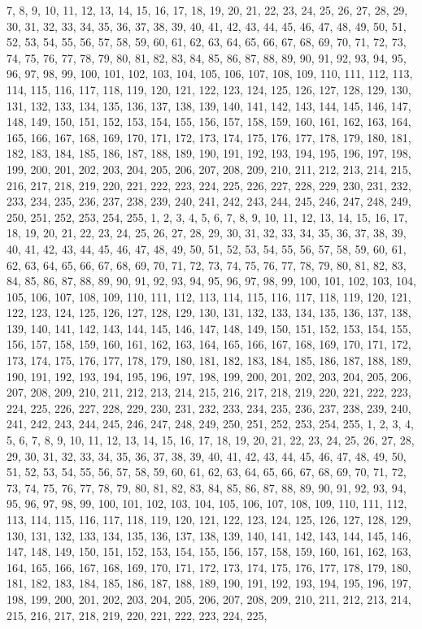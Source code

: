 7, 8, 9, 10, 11, 12, 13, 14, 15, 16, 17, 18, 19, 20, 21, 22, 23, 24, 25, 26, 27, 28, 29, 30, 31, 32, 33, 34, 35, 36, 37, 38, 39, 40, 41, 42, 43, 44, 45, 46, 47, 48, 49, 50, 51, 52, 53, 54, 55, 56, 57, 58, 59, 60, 61, 62, 63, 64, 65, 66, 67, 68, 69, 70, 71, 72, 73, 74, 75, 76, 77, 78, 79, 80, 81, 82, 83, 84, 85, 86, 87, 88, 89, 90, 91, 92, 93, 94, 95, 96, 97, 98, 99, 100, 101, 102, 103, 104, 105, 106, 107, 108, 109, 110, 111, 112, 113, 114, 115, 116, 117, 118, 119, 120, 121, 122, 123, 124, 125, 126, 127, 128, 129, 130, 131, 132, 133, 134, 135, 136, 137, 138, 139, 140, 141, 142, 143, 144, 145, 146, 147, 148, 149, 150, 151, 152, 153, 154, 155, 156, 157, 158, 159, 160, 161, 162, 163, 164, 165, 166, 167, 168, 169, 170, 171, 172, 173, 174, 175, 176, 177, 178, 179, 180, 181, 182, 183, 184, 185, 186, 187, 188, 189, 190, 191, 192, 193, 194, 195, 196, 197, 198, 199, 200, 201, 202, 203, 204, 205, 206, 207, 208, 209, 210, 211, 212, 213, 214, 215, 216, 217, 218, 219, 220, 221, 222, 223, 224, 225, 226, 227, 228, 229, 230, 231, 232, 233, 234, 235, 236, 237, 238, 239, 240, 241, 242, 243, 244, 245, 246, 247, 248, 249, 250, 251, 252, 253, 254, 255, 1, 2, 3, 4, 5, 6, 7, 8, 9, 10, 11, 12, 13, 14, 15, 16, 17, 18, 19, 20, 21, 22, 23, 24, 25, 26, 27, 28, 29, 30, 31, 32, 33, 34, 35, 36, 37, 38, 39, 40, 41, 42, 43, 44, 45, 46, 47, 48, 49, 50, 51, 52, 53, 54, 55, 56, 57, 58, 59, 60, 61, 62, 63, 64, 65, 66, 67, 68, 69, 70, 71, 72, 73, 74, 75, 76, 77, 78, 79, 80, 81, 82, 83, 84, 85, 86, 87, 88, 89, 90, 91, 92, 93, 94, 95, 96, 97, 98, 99, 100, 101, 102, 103, 104, 105, 106, 107, 108, 109, 110, 111, 112, 113, 114, 115, 116, 117, 118, 119, 120, 121, 122, 123, 124, 125, 126, 127, 128, 129, 130, 131, 132, 133, 134, 135, 136, 137, 138, 139, 140, 141, 142, 143, 144, 145, 146, 147, 148, 149, 150, 151, 152, 153, 154, 155, 156, 157, 158, 159, 160, 161, 162, 163, 164, 165, 166, 167, 168, 169, 170, 171, 172, 173, 174, 175, 176, 177, 178, 179, 180, 181, 182, 183, 184, 185, 186, 187, 188, 189, 190, 191, 192, 193, 194, 195, 196, 197, 198, 199, 200, 201, 202, 203, 204, 205, 206, 207, 208, 209, 210, 211, 212, 213, 214, 215, 216, 217, 218, 219, 220, 221, 222, 223, 224, 225, 226, 227, 228, 229, 230, 231, 232, 233, 234, 235, 236, 237, 238, 239, 240, 241, 242, 243, 244, 245, 246, 247, 248, 249, 250, 251, 252, 253, 254, 255, 1, 2, 3, 4, 5, 6, 7, 8, 9, 10, 11, 12, 13, 14, 15, 16, 17, 18, 19, 20, 21, 22, 23, 24, 25, 26, 27, 28, 29, 30, 31, 32, 33, 34, 35, 36, 37, 38, 39, 40, 41, 42, 43, 44, 45, 46, 47, 48, 49, 50, 51, 52, 53, 54, 55, 56, 57, 58, 59, 60, 61, 62, 63, 64, 65, 66, 67, 68, 69, 70, 71, 72, 73, 74, 75, 76, 77, 78, 79, 80, 81, 82, 83, 84, 85, 86, 87, 88, 89, 90, 91, 92, 93, 94, 95, 96, 97, 98, 99, 100, 101, 102, 103, 104, 105, 106, 107, 108, 109, 110, 111, 112, 113, 114, 115, 116, 117, 118, 119, 120, 121, 122, 123, 124, 125, 126, 127, 128, 129, 130, 131, 132, 133, 134, 135, 136, 137, 138, 139, 140, 141, 142, 143, 144, 145, 146, 147, 148, 149, 150, 151, 152, 153, 154, 155, 156, 157, 158, 159, 160, 161, 162, 163, 164, 165, 166, 167, 168, 169, 170, 171, 172, 173, 174, 175, 176, 177, 178, 179, 180, 181, 182, 183, 184, 185, 186, 187, 188, 189, 190, 191, 192, 193, 194, 195, 196, 197, 198, 199, 200, 201, 202, 203, 204, 205, 206, 207, 208, 209, 210, 211, 212, 213, 214, 215, 216, 217, 218, 219, 220, 221, 222, 223, 224, 225, 